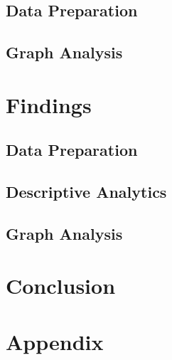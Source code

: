 \documentclass[conference]{IEEEtran}
\begin{document}
\subsection{Data Preparation}
\label{methods-data-preparation}


\subsection{Graph Analysis}
\label{methods-graph-analysis}


\section{Findings}
\label{findings}
\subsection{Data Preparation}
\label{findings-data-preparation}


\subsection{Descriptive Analytics}
\label{findings-descriptive}


\subsection{Graph Analysis}
\label{findings-graph-analysis}


\section{Conclusion}
\label{conclusion}


\section{Appendix}
\label{appendix}

\newpage
\newpage


\end{document}
